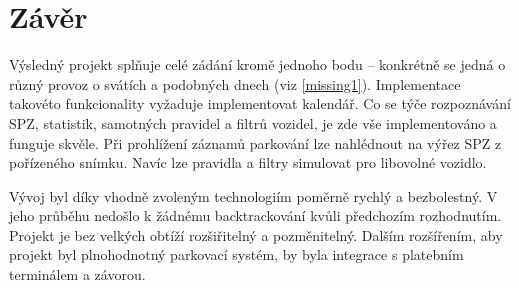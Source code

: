 \chapter*{Závěr}

Výsledný projekt splňuje celé zádání kromě jednoho bodu -- konkrétně se jedná o
různý provoz
o svátích a podobných dnech (viz \ref{missing1}). Implementace takovéto funkcionality
vyžaduje implementovat kalendář.
Co se týče rozpoznávání SPZ, statistik, samotných pravidel a filtrů vozidel, je zde
vše implementováno a funguje skvěle.
Při prohlížení záznamů parkování lze nahlédnout na výřez SPZ z pořízeného snímku.
Navíc lze pravidla a filtry simulovat pro libovolné vozidlo.

Vývoj byl díky vhodně zvoleným technologiím poměrně rychlý a bezbolestný.
V jeho průběhu nedošlo k žádnému backtrackování kvůli předchozím rozhodnutím.
Projekt je bez velkých obtíží rozšiřitelný a pozměnitelný.
Dalším rozšířením, aby projekt byl plnohodnotný parkovací systém, by byla
integrace s platebním terminálem a závorou.
